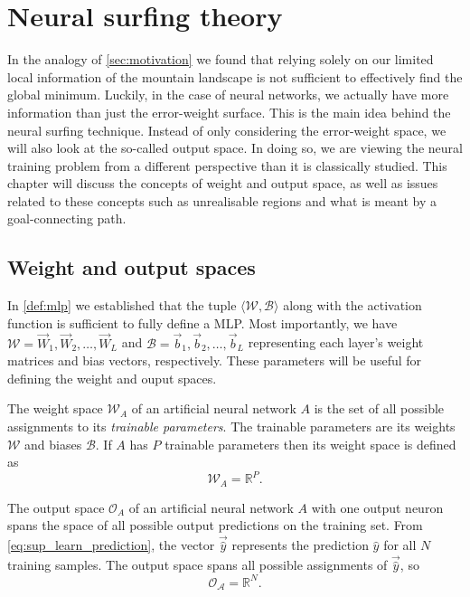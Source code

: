 \chapter{Neural surfing theory}
\label{chap:neural_surfing_theory}
In the analogy of \ref{sec:motivation} we found that relying solely on our limited local information of the mountain landscape is not sufficient to effectively find the global minimum.
Luckily, in the case of neural networks, we actually have more information than just the error-weight surface.
This is the main idea behind the neural surfing technique. 
Instead of only considering the error-weight space, we will also look at the so-called output space. 
In doing so, we are viewing the neural training problem from a different perspective than it is classically studied. 
This chapter will discuss the concepts of weight and output space, as well as issues related to these concepts such as unrealisable regions and what is meant by a goal-connecting path.

\section{Weight and output spaces}
\label{sec:weight_and_output_spaces}
In \ref{def:mlp} we established that the tuple $\langle \mathscr{W}, \mathscr{B} \rangle$ along with the activation function is sufficient to fully define a MLP. 
Most importantly, we have $\mathscr{W} = \vec{W}_1, \vec{W}_2, \dots, \vec{W}_L$ and $\mathscr{B} = \vec{b}_1, \vec{b}_2, \dots, \vec{b}_L$ representing each layer's weight matrices and bias vectors, respectively. 
These parameters will be useful for defining the weight and ouput spaces.

\begin{definition}
    \label{def:weight_space}
    The weight space $\mathcal{W}_A$ of an artificial neural network $A$ is the set of all possible assignments to its \textit{trainable parameters}. 
    The trainable parameters are its weights $\mathscr{W}$ and biases $\mathscr{B}$.
    If $A$ has $P$ trainable parameters then its weight space is defined as
    \begin{equation}
        \mathcal{W}_A = \mathbb{R}^P.
    \end{equation}
\end{definition}

\begin{definition}
    \label{def:output_space}
    The output space $\mathcal{O}_A$ of an artificial neural network $A$ with one output neuron spans the space of all possible output predictions on the training set.
    From \ref{eq:sup_learn_prediction}, the vector $\vec{\hat{y}}$ represents the prediction $\hat{y}$ for all $N$ training samples.
    The output space spans all possible assignments of $\vec{\hat{y}}$, so
    \begin{equation}
        \mathcal{O_A}=\mathbb{R}^N.
    \end{equation}
\end{definition}

